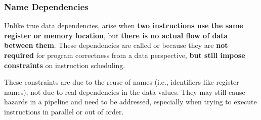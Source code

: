\subsubsection{Name Dependencies}

Unlike true data dependencies,  arise when \textbf{two instructions use the same register or memory location}, but \textbf{there is no actual flow of data between them}. These dependencies are called  or  because they are \textbf{not required} for program correctness from a data perspective, \textbf{but still impose constraints} on instruction scheduling.

\highspace
These constraints are due to the reuse of names (i.e., identifiers like register names), not due to real dependencies in the data values. They may still cause hazards in a pipeline and need to be addressed, especially when trying to execute instructions in parallel or out of order.

